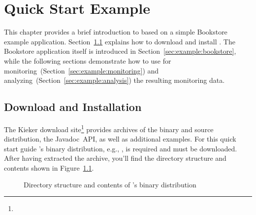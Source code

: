 % 


\chapter{Quick Start Example}\label{chap:example}

This chapter provides a brief introduction to \Kieker{} based on a simple %
Bookstore example application. Section~\ref{sec:example:downloadInstall} %
explains how to download and install \Kieker{}. The Bookstore application itself %
is introduced in Section~\ref{sec:example:bookstore}, while the following %
sections demonstrate %
how to use \Kieker{} for monitoring~(Section~\ref{sec:example:monitoring}) and %
analyzing~(Section~\ref{sec:example:analysis}) the resulting monitoring data. %

\section{Download and Installation}\label{sec:example:downloadInstall}

The Kieker download site\footnote{\KiekerDownloadURL{}} provides archives %
of the binary and source distribution, the Javadoc~API, as well %
as additional examples. %
For this quick start guide \Kieker{}'s binary distribution, e.g., %
\file{\binaryFileForDownload}, is required and must be downloaded. %
After having extracted the archive, you'll find the directory structure and %
contents shown in Figure~\ref{fig:binary-layout}.

\enlargethispage{0.8cm}

\begin{figure}[h!]%
\begin{graybox}
\end{graybox}
\caption{Directory structure and contents of \Kieker{}'s binary distribution}
\label{fig:binary-layout}
\end{figure}

